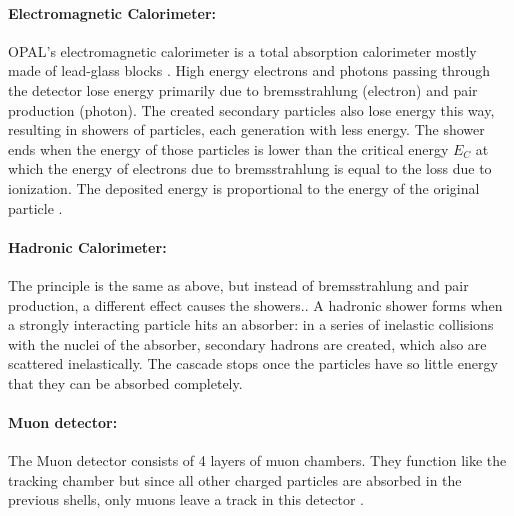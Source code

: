 \paragraph{Electromagnetic Calorimeter:}
OPAL's electromagnetic calorimeter is a total absorption calorimeter mostly made of lead-glass blocks \cite{cern}. High energy electrons and photons passing through the detector lose energy primarily due to bremsstrahlung (electron) and pair production (photon). The created secondary particles also lose energy this way, resulting in showers of particles, each generation with less energy. The shower ends when the energy of those particles is lower than the critical energy $E_C$ at which the energy of electrons due to bremsstrahlung is equal to the loss due to ionization. The deposited energy is proportional to the energy of the original particle \cite{muenchen}.

\paragraph{Hadronic Calorimeter:}
The principle is the same as above, but instead of bremsstrahlung and pair production, a different effect causes the showers.. A hadronic shower forms when a strongly interacting particle hits an absorber: in a series of inelastic collisions with the nuclei of the absorber, secondary hadrons are created, which also are scattered inelastically. The cascade stops once the particles have so little energy that they can be absorbed completely.
\paragraph{Muon detector:}
The Muon detector consists of 4 layers of muon chambers. They function like the tracking chamber but since all other charged particles are absorbed in the previous shells, only muons leave a track in this detector \cite{muenchen}.